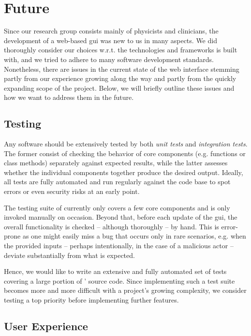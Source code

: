 \documentclass[\relativeRoot/main.tex]{subfiles}
\begin{document}
\section{Future}
\label{sec:lyprox:future}

Since our research group consists mainly of physicists and clinicians, the development of a web-based \gls{gui} was new to us in many aspects. We did thoroughly consider our choices w.r.t. the technologies and frameworks \inlinelyproxlogo{} is built with, and we tried to adhere to many software development standards. Nonetheless, there are issues in the current state of the web interface stemming partly from our experience growing along the way and partly from the quickly expanding scope of the project. Below, we will briefly outline these issues and how we want to address them in the future.

\subsection*{Testing}

Any software should be extensively tested by both \emph{unit tests} and \emph{integration tests}. The former consist of checking the behavior of core components (e.g. functions or class methods) separately against expected results, while the latter assesses whether the individual components together produce the desired output. Ideally, all tests are fully automated and run regularly against the code base to spot errors or even security risks at an early point.

The testing suite of \inlinelyproxlogo{} currently only covers a few core components and is only invoked manually on occasion. Beyond that, before each update of the \gls{gui}, the overall functionality is checked -- although thoroughly -- by hand. This is error-prone as one might easily miss a bug that occurs only in rare scenarios, e.g. when the provided inputs -- perhaps intentionally, in the case of a malicious actor -- deviate substantially from what is expected.

Hence, we would like to write an extensive and fully automated set of tests covering a large portion of \inlinelyproxlogo{}' source code. Since implementing such a test suite becomes more and more difficult with a project's growing complexity, we consider testing a top priority before implementing further features.

\subsection*{User Experience}
\end{document}
